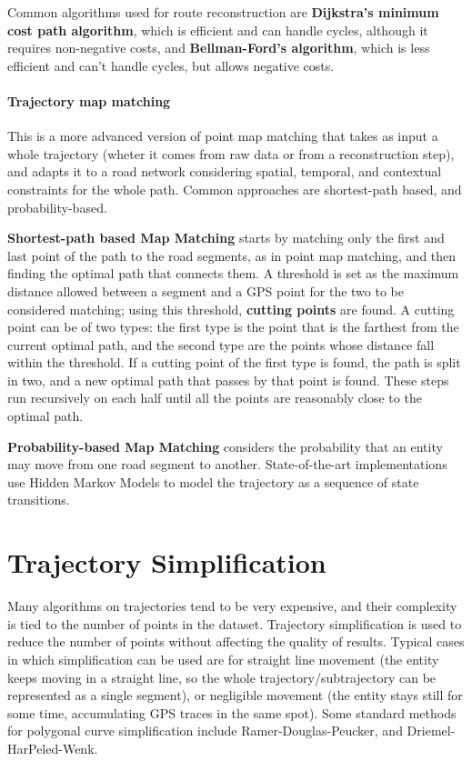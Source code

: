 Common algorithms used for route reconstruction are \textbf{Dijkstra's minimum cost path algorithm}, which is efficient and can handle cycles, although it requires non-negative costs, and \textbf{Bellman-Ford's algorithm}, which is less efficient and can't handle cycles, but allows negative costs.

\paragraph{Trajectory map matching}
This is a more advanced version of point map matching that takes as input a whole trajectory (wheter it comes from raw data or from a reconstruction step), and adapts it to a road network considering spatial, temporal, and contextual constraints for the whole path. Common approaches are shortest-path based, and probability-based.

\textbf{Shortest-path based Map Matching} starts by matching only the first and last point of the path to the road segments, as in point map matching, and then finding the optimal path that connects them. A threshold is set as the maximum distance allowed between a segment and a GPS point for the two to be considered matching; using this threshold, \textbf{cutting points} are found. A cutting point can be of two types: the first type is the point that is the farthest from the current optimal path, and the second type are the points whose distance fall within the threshold. If a cutting point of the first type is found, the path is split in two, and a new optimal path that passes by that point is found. These steps run recursively on each half until all the points are reasonably close to the optimal path.

\textbf{Probability-based Map Matching} considers the probability that an entity may move from one road segment to another. State-of-the-art implementations use Hidden Markov Models to model the trajectory as a sequence of state transitions.

\section{Trajectory Simplification}

Many algorithms on trajectories tend to be very expensive, and their complexity is tied to the number of points in the dataset. Trajectory simplification is used to reduce the number of points without affecting the quality of results. Typical cases in which simplification can be used are for straight line movement (the entity keeps moving in a straight line, so the whole trajectory/subtrajectory can be represented as a single segment), or negligible movement (the entity stays still for some time, accumulating GPS traces in the same spot). Some standard methods for polygonal curve simplification include Ramer-Douglas-Peucker, and Driemel-HarPeled-Wenk.

